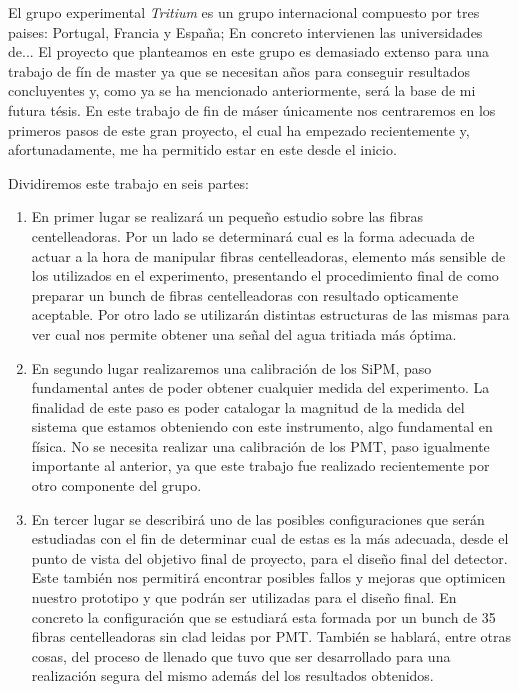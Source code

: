 El grupo experimental \textit{Tritium} es un grupo internacional compuesto por tres paises: Portugal, Francia y España; En concreto intervienen las universidades de...  El proyecto que planteamos en este grupo es demasiado extenso para una trabajo de fín de master ya que se necesitan años para conseguir resultados concluyentes y, como ya se ha mencionado anteriormente, será la base de mi futura tésis. En este trabajo de fin de máser únicamente nos centraremos en los primeros pasos de este gran proyecto, el cual ha empezado recientemente y, afortunadamente, me ha permitido estar en este desde el inicio.


Dividiremos este trabajo en seis partes:
\begin{enumerate}
\item{} En primer lugar se realizará un pequeño estudio sobre las fibras centelleadoras. Por un lado se determinará cual es la forma adecuada de actuar a la hora de manipular fibras centelleadoras, elemento más sensible de los utilizados en el experimento, presentando el procedimiento final de como preparar un bunch de fibras centelleadoras con resultado opticamente aceptable. Por otro lado se utilizarán distintas estructuras de las mismas para ver cual nos permite obtener una señal del agua tritiada  más óptima. 

\item{} En segundo lugar realizaremos una calibración de los SiPM, paso fundamental antes de poder obtener cualquier medida del experimento. La finalidad de este paso es poder catalogar la magnitud de la medida del sistema que estamos obteniendo con este instrumento, algo fundamental en física. No se necesita realizar una calibración de los PMT, paso igualmente importante al anterior, ya que este trabajo fue realizado recientemente por otro componente del grupo.

\item{} En tercer lugar se describirá uno de las posibles configuraciones que serán estudiadas con el fin de determinar cual de estas es la más adecuada, desde el punto de vista del objetivo final de proyecto, para el diseño final del detector. Este también nos permitirá encontrar posibles fallos y mejoras que optimicen nuestro prototipo y que podrán ser utilizadas para el diseño final. En concreto la configuración que se estudiará esta formada por un bunch de 35 fibras centelleadoras sin clad leidas por PMT. También se hablará, entre otras cosas, del proceso de llenado que tuvo que ser desarrollado para una realización segura del mismo además del los resultados obtenidos.


\end{enumerate}
